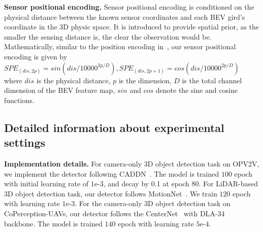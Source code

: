 \documentclass{article}
\begin{document}
\textbf{Sensor positional encoding.} Sensor positional encoding is conditioned on the physical distance between the known sensor coordinates and each BEV gird's coordinate in the 3D physic space. It is introduced to provide spatial prior, as the smaller the sensing distance is, the clear the observation would be. Mathematically, similar to the position encoding in~\cite{vaswani2017attention}, our sensor positional encoding is given by 
$
SPE_{(dis, 2p)} = sin(dis/10000^{2p/D}),
SPE_{(dis, 2p+1)} = cos(dis/10000^{2p/D})
$
where $dis$ is the physical distance, $p$ is the dimension, $D$ is the total channel dimension of the BEV feature map, $sin$ and $cos$ denote the sine and cosine functions.

\subsection{Detailed information about experimental settings}
\textbf{Implementation details.} For camera-only 3D object detection task on OPV2V, we implement the detector following CADDN~\cite{CaDDN}. The model is trained $100$ epoch with initial learning rate of $1$e-$3$, and decay by 0.1 at epoch 80. For LiDAR-based 3D object detection task, our detector follows MotionNet~\cite{Wu2020MotionNetJP}. We train $120$ epoch with learning rate $1$e-$3$. For the camera-only 3D object detection task on CoPerception-UAVs, our detector follows the CenterNet~\cite{zhou2019objects} with DLA-34~\cite{yu2018dla} backbone. The model is trained $140$ epoch with learning rate $5$e-$4$. 
\end{document}
